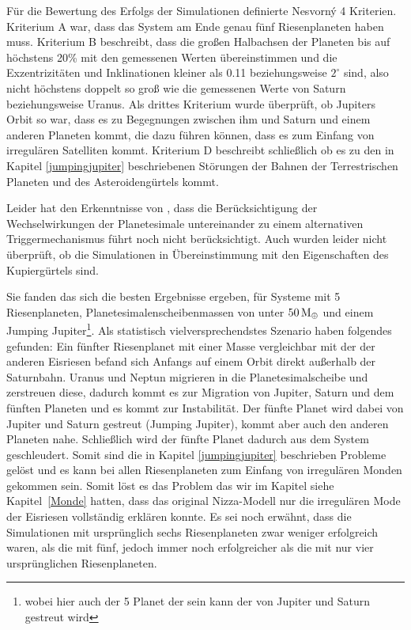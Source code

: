 \documentclass[12pt,a4paper,twoside]{article}
\renewcommand{\cite}{\citep}
\newcommand{\refsec}[1]{siehe Kapitel~\ref{#1}}
\newcommand{\ME}{M_\oplus}
\begin{document}
Für die Bewertung des Erfolgs der Simulationen definierte Nesvorný 4 Kriterien. Kriterium A war, dass das System am Ende genau fünf Riesenplaneten haben muss. Kriterium B beschreibt, dass die großen Halbachsen der Planeten bis auf höchstens 20\% mit den gemessenen Werten übereinstimmen und die Exzentrizitäten und Inklinationen kleiner als 0.11 beziehungsweise $2^\circ$ sind, also nicht höchstens doppelt so groß wie die gemessenen Werte von Saturn beziehungsweise Uranus.
Als drittes Kriterium wurde überprüft, ob Jupiters Orbit so war, dass es zu Begegnungen zwischen ihm und Saturn und einem anderen Planeten kommt, die dazu führen können, dass es zum Einfang von irregulären Satelliten kommt.
Kriterium D beschreibt schließlich ob es zu den in Kapitel \ref{jumpingjupiter} beschriebenen Störungen der Bahnen der Terrestrischen Planeten und des Asteroidengürtels kommt. %

Leider hat \cite{Nesvorny2012} den Erkenntnisse von \cite{Levison2011}, dass die Berücksichtigung der Wechselwirkungen der Planetesimale untereinander zu einem alternativen Triggermechanismus führt noch nicht berücksichtigt. Auch wurden leider nicht überprüft, ob die Simulationen in Übereinstimmung mit den Eigenschaften des Kupiergürtels sind.

Sie fanden das sich die besten Ergebnisse ergeben, für Systeme mit 5 Riesenplaneten, Planetesimalenscheibenmassen von unter $\unit[50]{\ME}$ und einem Jumping Jupiter\footnote{wobei hier auch der 5 Planet der sein kann der von Jupiter und Saturn gestreut wird}.
Als statistisch vielversprechendstes Szenario haben \cite{Nesvorny2012} folgendes gefunden:
Ein fünfter Riesenplanet mit einer Masse vergleichbar mit der der anderen Eisriesen befand sich Anfangs auf einem Orbit direkt außerhalb der Saturnbahn.
Uranus und Neptun migrieren in die Planetesimalscheibe und zerstreuen diese, dadurch kommt es zur Migration von Jupiter, Saturn und dem fünften Planeten und es kommt zur Instabilität. Der fünfte Planet wird dabei von Jupiter und Saturn gestreut (Jumping Jupiter), kommt aber auch den anderen Planeten nahe. Schließlich wird der fünfte Planet dadurch aus dem System geschleudert.
Somit sind die in Kapitel \ref{jumpingjupiter} beschrieben Probleme gelöst und es kann bei allen Riesenplaneten zum Einfang von irregulären Monden gekommen sein. Somit löst es das Problem das wir im Kapitel \refsec{Monde} hatten, dass das original Nizza-Modell nur die irregulären Mode der Eisriesen vollständig erklären konnte.
Es sei noch erwähnt, dass die Simulationen mit ursprünglich sechs Riesenplaneten zwar weniger erfolgreich waren, als die mit fünf, jedoch immer noch erfolgreicher als die mit nur vier ursprünglichen Riesenplaneten.
\end{document}
